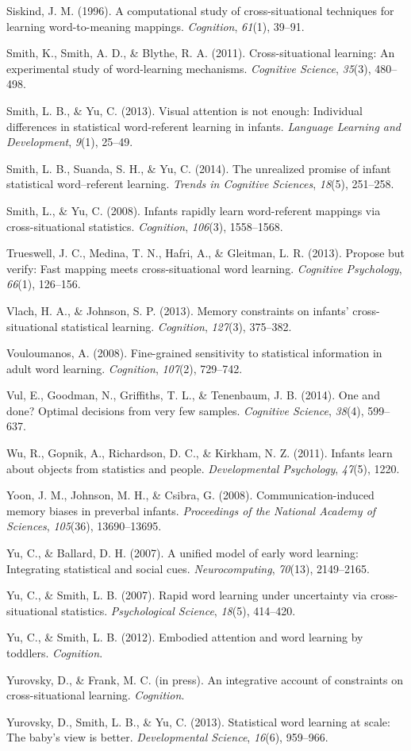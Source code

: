 \documentclass[a4paper,man,natbib]{apa6}
\begin{document}
Siskind, J. M. (1996). A computational study of cross-situational
techniques for learning word-to-meaning mappings. \emph{Cognition},
\emph{61}(1), 39--91.

Smith, K., Smith, A. D., \& Blythe, R. A. (2011). Cross-situational
learning: An experimental study of word-learning mechanisms.
\emph{Cognitive Science}, \emph{35}(3), 480--498.

Smith, L. B., \& Yu, C. (2013). Visual attention is not enough:
Individual differences in statistical word-referent learning in infants.
\emph{Language Learning and Development}, \emph{9}(1), 25--49.

Smith, L. B., Suanda, S. H., \& Yu, C. (2014). The unrealized promise of
infant statistical word--referent learning. \emph{Trends in Cognitive
Sciences}, \emph{18}(5), 251--258.

Smith, L., \& Yu, C. (2008). Infants rapidly learn word-referent
mappings via cross-situational statistics. \emph{Cognition},
\emph{106}(3), 1558--1568.

Trueswell, J. C., Medina, T. N., Hafri, A., \& Gleitman, L. R. (2013).
Propose but verify: Fast mapping meets cross-situational word learning.
\emph{Cognitive Psychology}, \emph{66}(1), 126--156.

Vlach, H. A., \& Johnson, S. P. (2013). Memory constraints on infants'
cross-situational statistical learning. \emph{Cognition}, \emph{127}(3),
375--382.

Vouloumanos, A. (2008). Fine-grained sensitivity to statistical
information in adult word learning. \emph{Cognition}, \emph{107}(2),
729--742.

Vul, E., Goodman, N., Griffiths, T. L., \& Tenenbaum, J. B. (2014). One
and done? Optimal decisions from very few samples. \emph{Cognitive
Science}, \emph{38}(4), 599--637.

Wu, R., Gopnik, A., Richardson, D. C., \& Kirkham, N. Z. (2011). Infants
learn about objects from statistics and people. \emph{Developmental
Psychology}, \emph{47}(5), 1220.

Yoon, J. M., Johnson, M. H., \& Csibra, G. (2008). Communication-induced
memory biases in preverbal infants. \emph{Proceedings of the National
Academy of Sciences}, \emph{105}(36), 13690--13695.

Yu, C., \& Ballard, D. H. (2007). A unified model of early word
learning: Integrating statistical and social cues.
\emph{Neurocomputing}, \emph{70}(13), 2149--2165.

Yu, C., \& Smith, L. B. (2007). Rapid word learning under uncertainty
via cross-situational statistics. \emph{Psychological Science},
\emph{18}(5), 414--420.

Yu, C., \& Smith, L. B. (2012). Embodied attention and word learning by
toddlers. \emph{Cognition}.

Yurovsky, D., \& Frank, M. C. (in press). An integrative account of
constraints on cross-situational learning. \emph{Cognition}.

Yurovsky, D., Smith, L. B., \& Yu, C. (2013). Statistical word learning
at scale: The baby's view is better. \emph{Developmental Science},
\emph{16}(6), 959--966.


\end{document}
